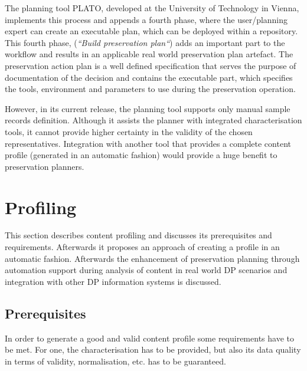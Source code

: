 The planning tool PLATO, developed at the University of Technology in Vienna, implements this process and appends a fourth phase, where the user/planning expert can create an executable plan, which can be deployed within a repository. 
This fourth phase, (\textit{``Build preservation plan``}) adds an important part to the workflow and results in an applicable real world preservation plan artefact. The preservation action plan is a well defined specification that serves the purpose of documentation of the decision and contains the executable part, which specifies the tools, environment and parameters to use during the preservation operation.

However, in its current release, the planning tool supports only manual sample records definition. Although it assists the planner with integrated characterisation tools, it cannot provide higher certainty in the validity of the chosen representatives. Integration with another tool that provides a complete content profile (generated in an automatic fashion) would provide a huge benefit to preservation planners.

\section{Profiling}
\label{sec:content_profiling}
This section describes content profiling and discusses its prerequisites and requirements. Afterwards it proposes an approach of creating a profile in an automatic fashion. Afterwards the enhancement of preservation planning through automation support during analysis of content in real world DP scenarios and integration with other DP information systems is discussed.

\subsection{Prerequisites}
In order to generate a good and valid content profile some requirements have to be met. For one, the characterisation has to be provided, but also its data quality in terms of validity, normalisation, etc. has to be guaranteed.

